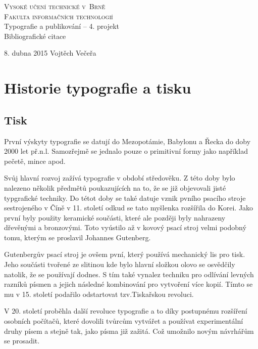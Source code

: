 \documentclass[11pt,a4paper,onecolumn]{article}
\begin{document}
\begin{titlepage}
  \begin{center}

    \textsc{\Huge Vysoké učení technické v~Brně\\\huge Fakulta informačních technologií}\\
    \LARGE Typografie a publikování -- 4. projekt\\\Huge
    Bibliografické citace\\
  \end{center}
  {\Large 8. dubna 2015 \hfill Vojtěch Večeřa}
\end{titlepage}

\section*{Historie typografie a tisku}
\subsection*{Tisk}
\noindent První výskyty typografie se datují do Mezopotámie, Babylonu a Řecka do doby 2000 let př.n.l. Samozřejmě se jednalo pouze o primitivní formy jako například pečetě, mince apod. 

\indent Svůj hlavní rozvoj zažívá typografie v období středověku. Z této doby bylo nalezeno několik předmětů poukazujících na to, že se již objevovali jisté typgrafické techniky. Do tétot doby se také datuje vznik pvního  psacího stroje sestrojeného v Číně v 11. století odkud se tato myšlenka rozšířila do Korei. Jako první byly použity keramické součásti, které ale později byly nahrazeny dřevěnými a bronzovými. Toto vyústilo až v kovový psací stroj velmi podobný tomu, kterým se proslavil Johannes Gutenberg.

\indent Gutenbergův psací stroj je ovšem pvní, který používá mechanický lis pro tisk. Jeho součásti tvořené ze slitinou kde bylo hlavní složkou olovo se osvědčily natolik, že se používají dodnes. S tím také vynalez techniku pro odlívání levných razníků písmen a jejich následné kombinování pro vytvoření více kopií. Tímto se mu v 15. století podařilo odstartovat tzv.Tiskařskou revoluci.

\indent V 20. století proběhla další revoluce typografie a to díky postupnému rozšíření osobních počítačů, které dovolili tvůrcům vytvářet a používat experimentální druhy písem a stejně tak, jako písma již zažitá. Což umožnilo novým návrhářům se prosadit.
\end{document}

